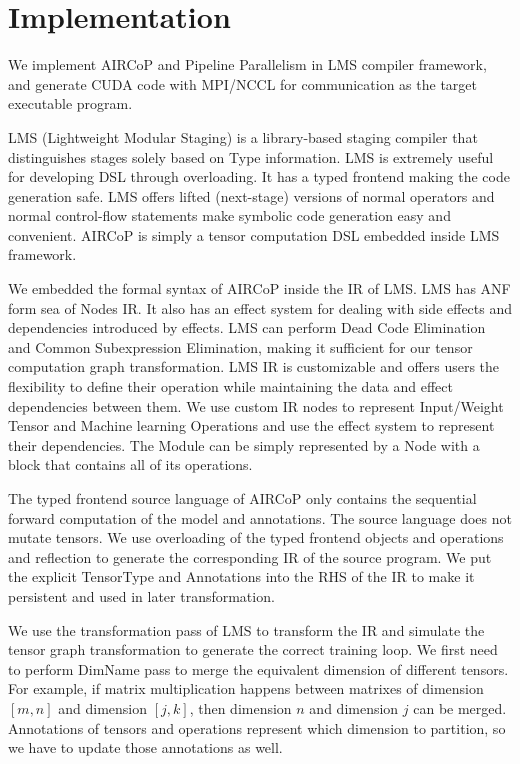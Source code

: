 \documentclass[sigplan]{acmart}\settopmatter{printfolios=true,printccs=false,printacmref=false}
\begin{document}
 \section{Implementation} \label{implementation}
 We implement AIRCoP and Pipeline Parallelism in LMS compiler framework\cite{rompf2010lightweight}, and generate CUDA\cite{sanders2010cuda} code with MPI\cite{gropp1999using}/NCCL for communication as the target executable program.\par
  LMS (Lightweight Modular Staging) is a library-based staging compiler that distinguishes stages solely based on Type information. LMS is extremely useful for developing DSL through overloading. It has a typed frontend making the code generation safe. LMS offers lifted (next-stage) versions of normal operators and normal control-flow statements make symbolic code generation easy and convenient. AIRCoP is simply a tensor computation DSL embedded inside LMS framework.\par
 We embedded the formal syntax of AIRCoP inside the IR of LMS. LMS has ANF\cite{flanagan1993essence} form sea of Nodes\cite{click1995simple} IR. It also has an effect system for dealing with side effects and dependencies introduced by effects. LMS can perform Dead Code Elimination and Common Subexpression Elimination, making it sufficient for our tensor computation graph transformation. LMS IR is customizable and offers users the flexibility to define their operation while maintaining the data and effect dependencies between them. We use custom IR nodes to represent Input/Weight Tensor and Machine learning Operations and use the effect system to represent their dependencies. The Module can be simply represented by a Node with a block that contains all of its operations. \par
 The typed frontend source language of AIRCoP only contains the sequential forward computation of the model and annotations. The source language does not mutate tensors. We use overloading of the typed frontend objects and operations and reflection to generate the corresponding IR of the source program. We put the explicit TensorType and Annotations into the RHS of the IR to make it persistent and used in later transformation. \par
 We use the transformation pass of LMS to transform the IR and simulate the tensor graph transformation to generate the correct training loop. We first need to perform DimName pass to merge the equivalent dimension of different tensors. For example, if matrix multiplication happens between matrixes of dimension $[m, n]$ and dimension $[j,k]$, then dimension $n$ and dimension $j$ can be merged.  Annotations of tensors and operations represent which dimension to partition, so we have to update those annotations as well. \par
\end{document}
